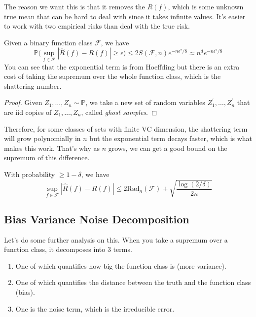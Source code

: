 \documentclass{article}
\begin{document}
    The reason we want this is that it removes the $R(f)$, which is some unknown true mean that can be hard to deal with since it takes infinite values. It's easier to work with two empirical risks than deal with the true risk. 

    \begin{theorem}
      Given a binary function class $\mathcal{F}$, we have
      \begin{equation}
        \mathbb{P} \bigg( \sup_{f \in \mathcal{F}} | \hat{R} (f) - R(f) | \geq \epsilon \bigg) \leq 2 S(\mathcal{F}, n) e^{-n \epsilon^2 / 8} \approx n^d e^{-n \epsilon^2 / 8}
      \end{equation}
      You can see that the exponential term is from Hoeffding but there is an extra cost of taking the supremum over the whole function class, which is the shattering number.
    \end{theorem}
    \begin{proof}
      Given $Z_1, \ldots, Z_n \sim \mathbb{P}$, we take a new set of random variables $Z_1^\prime, \ldots, Z_n^\prime$ that are iid copies of $Z_1, \ldots, Z_n$, called \textit{ghost samples}. 
    \end{proof}

    Therefore, for some classes of sets with finite VC dimension, the shattering term will grow polynomially in $n$ but the exponential term decays faster, which is what makes this work. That's why as $n$ grows, we can get a good bound on the supremum of this difference. 

    \begin{theorem}
      With probability $\geq 1 - \delta$, we have 
      \begin{equation}
        \sup_{f \in \mathcal{F}} | \hat{R} (f) - R(f) | \leq 2 \mathrm{Rad}_n (\mathcal{F}) + \sqrt{\frac{\log (2 / \delta)}{2 n}}
      \end{equation}
    \end{theorem}

  \subsection{Bias Variance Noise Decomposition} 

    Let's do some further analysis on this. When you take a supremum over a function class, it decomposes into 3 terms. 
    \begin{enumerate}
      \item One of which quantifies how big the function class is (more variance). 
      \item One of which quantifies the distance between the truth and the function class (bias).  
      \item One is the noise term, which is the irreducible error. 
    \end{enumerate}
\end{document}
